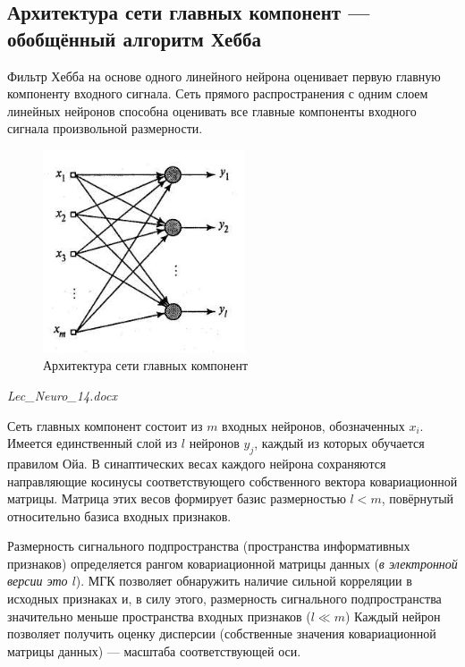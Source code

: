 \documentclass[a4paper]{article}
\numberwithin{equation}{subsection}
\begin{document}
\subsection{Архитектура сети главных компонент --- обобщённый алгоритм Хебба}

Фильтр Хебба на основе одного линейного нейрона оценивает первую главную компоненту 
входного сигнала. Сеть прямого распространения с одним слоем линейных нейронов 
способна оценивать все главные компоненты входного сигнала произвольной размерности.

\begin{figure}[htbp]
    \centering
    \includegraphics[height=6cm]{lec_neuro_14_8_6.png}
    \caption{Архитектура сети главных компонент}
    \label{lec_neuro_8_6}
\end{figure}

\begin{myquote}
    \textit{Lec\_Neuro\_14.docx}
\end{myquote}

Сеть главных компонент состоит из $m$ входных нейронов, обозначенных $x_i$.
Имеется единственный слой из $l$ нейронов $y_j$, каждый из которых обучается правилом Ойа. 
В синаптических весах каждого нейрона сохраняются направляющие косинусы соответствующего 
собственного вектора ковариационной матрицы. Матрица этих весов формирует базис размерностью $l<m$, 
повёрнутый относительно базиса входных признаков.

Размерность сигнального подпространства (пространства информативных признаков) определяется 
рангом ковариационной матрицы данных (\textit{в электронной версии это $l$}). МГК позволяет 
обнаружить наличие сильной корреляции в исходных признаках и, в силу этого, размерность
сигнального подпространства значительно меньше пространства входных признаков ($l \ll m$)
Каждый нейрон позволяет получить оценку дисперсии (собственные значения ковариационной 
матрицы данных) --- масштаба соответствующей оси.
\end{document}
